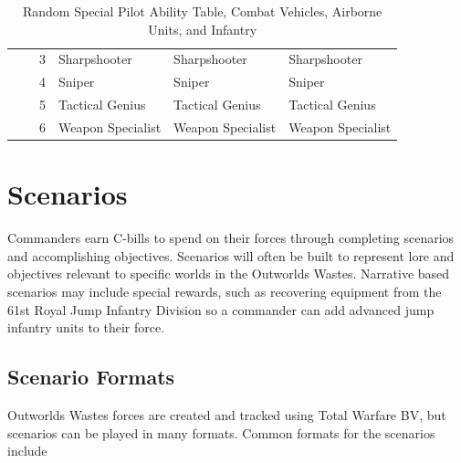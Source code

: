 \documentclass{article}
\begin{document}
\begin{itemize}
\begin{table}[!ht]
\begin{tabular}{| C{4em} | C{4em} | C{4em} | m{10em} | m{10em} | m{10em} |}
      &        & 3     & Sharpshooter      & Sharpshooter      & Sharpshooter      \\
      &        & 4     & Sniper            & Sniper            & Sniper            \\
      &        & 5     & Tactical Genius   & Tactical Genius   & Tactical Genius   \\
      &        & 6     & Weapon Specialist & Weapon Specialist & Weapon Specialist \\
\hline
\end{tabular}
\caption*{Random Special Pilot Ability Table, Combat Vehicles, Airborne Units, and Infantry}
\end{table}

\end{itemize}

\clearpage

\newpage

\section{Scenarios}

Commanders earn C-bills to spend on their forces through completing scenarios and accomplishing objectives.
Scenarios will often be built to represent lore and objectives relevant to specific worlds in the Outworlds Wastes.
Narrative based scenarios may include special rewards, such as recovering equipment from the 61st Royal Jump Infantry Division so a commander can add advanced jump infantry units to their force.

\subsection{Scenario Formats}

Outworlds Wastes forces are created and tracked using Total Warfare BV, but scenarios can be played in many formats.
Common formats for the scenarios include
\end{document}
